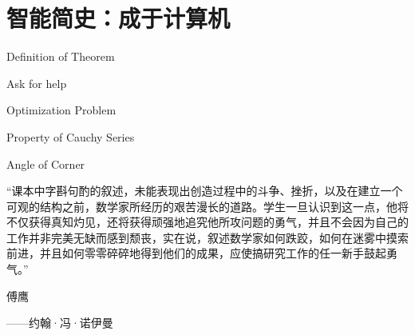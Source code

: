 \chapter{智能简史：成于计算机}

 \begin{introduction}
  \item Definition of Theorem
  \item Ask for help
  \item Optimization Problem
  \item Property of Cauchy Series
  \item Angle of Corner
\end{introduction}


“课本中字斟句酌的叙述，未能表现出创造过程中的斗争、挫折，以及在建立一个可观的结构之前，数学家所经历的艰苦漫长的道路。学生一旦认识到这一点，他将不仅获得真知灼见，还将获得顽强地追究他所攻问题的勇气，并且不会因为自己的工作并非完美无缺而感到颓丧，实在说，叙述数学家如何跌跤，如何在迷雾中摸索前进，并且如何零零碎碎地得到他们的成果，应使搞研究工作的任一新手鼓起勇气。”
   
\begin{flushright}
                                          傅鹰
\end{flushright}


\begin{flushright}
 ------约翰·冯·诺伊曼
\end{flushright}






\newpage
